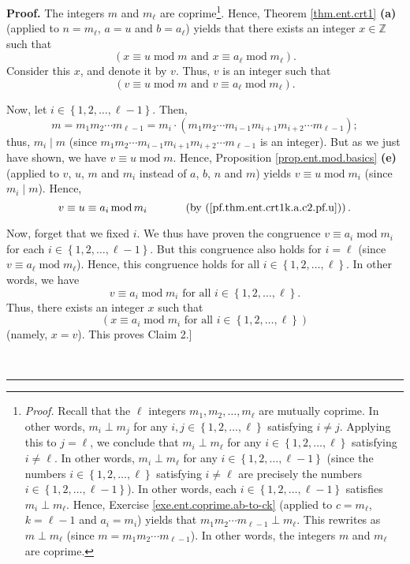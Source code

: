 \documentclass[numbers=enddot,12pt,final,onecolumn,notitlepage]{scrartcl}%
\numberwithin{exer}{subsection}
\theoremstyle{definition}
\newenvironment{proof}[1][Proof]{\noindent\textbf{#1.} }{\ \rule{0.5em}{0.5em}}
\begin{document}
\begin{proof}
The integers $m$ and $m_{\ell}$ are coprime\footnote{\textit{Proof.} Recall
that the $\ell$ integers $m_{1},m_{2},\ldots,m_{\ell}$ are mutually coprime.
In other words, $m_{i}\perp m_{j}$ for any $i,j\in\left\{  1,2,\ldots
,\ell\right\}  $ satisfying $i\neq j$. Applying this to $j=\ell$, we conclude
that $m_{i}\perp m_{\ell}$ for any $i\in\left\{  1,2,\ldots,\ell\right\}  $
satisfying $i\neq\ell$. In other words, $m_{i}\perp m_{\ell}$ for any
$i\in\left\{  1,2,\ldots,\ell-1\right\}  $ (since the numbers $i\in\left\{
1,2,\ldots,\ell\right\}  $ satisfying $i\neq\ell$ are precisely the numbers
$i\in\left\{  1,2,\ldots,\ell-1\right\}  $). In other words, each
$i\in\left\{  1,2,\ldots,\ell-1\right\}  $ satisfies $m_{i}\perp m_{\ell}$.
Hence, Exercise \ref{exe.ent.coprime.ab-to-ck} (applied to $c=m_{\ell}$,
$k=\ell-1$ and $a_{i}=m_{i}$) yields that $m_{1}m_{2}\cdots m_{\ell-1}\perp
m_{\ell}$. This rewrites as $m\perp m_{\ell}$ (since $m=m_{1}m_{2}\cdots
m_{\ell-1}$). In other words, the integers $m$ and $m_{\ell}$ are coprime.}.
Hence, Theorem \ref{thm.ent.crt1} \textbf{(a)} (applied to $n=m_{\ell}$, $a=u$
and $b=a_{\ell}$) yields that there exists an integer $x\in\mathbb{Z}$ such
that%
\[
\left(  x\equiv u\operatorname{mod}m\text{ and }x\equiv a_{\ell}%
\operatorname{mod}m_{\ell}\right)  .
\]
Consider this $x$, and denote it by $v$. Thus, $v$ is an integer such that%
\[
\left(  v\equiv u\operatorname{mod}m\text{ and }v\equiv a_{\ell}%
\operatorname{mod}m_{\ell}\right)  .
\]


Now, let $i\in\left\{  1,2,\ldots,\ell-1\right\}  $. Then,
\[
m=m_{1}m_{2}\cdots m_{\ell-1}=m_{i}\cdot\left(  m_{1}m_{2}\cdots
m_{i-1}m_{i+1}m_{i+2}\cdots m_{\ell-1}\right)  ;
\]
thus, $m_{i}\mid m$ (since $m_{1}m_{2}\cdots m_{i-1}m_{i+1}m_{i+2}\cdots
m_{\ell-1}$ is an integer). But as we just have shown, we have $v\equiv
u\operatorname{mod}m$. Hence, Proposition \ref{prop.ent.mod.basics}
\textbf{(e)} (applied to $v$, $u$, $m$ and $m_{i}$ instead of $a$, $b$, $n$
and $m$) yields $v\equiv u\operatorname{mod}m_{i}$ (since $m_{i}\mid m$).
Hence,
\[
v\equiv u\equiv a_{i}\operatorname{mod}m_{i}\ \ \ \ \ \ \ \ \ \ \left(
\text{by (\ref{pf.thm.ent.crt1k.a.c2.pf.u})}\right)  .
\]


Now, forget that we fixed $i$. We thus have proven the congruence $v\equiv
a_{i}\operatorname{mod}m_{i}$ for each $i\in\left\{  1,2,\ldots,\ell
-1\right\}  $. But this congruence also holds for $i=\ell$ (since $v\equiv
a_{\ell}\operatorname{mod}m_{\ell}$). Hence, this congruence holds for all
$i\in\left\{  1,2,\ldots,\ell\right\}  $. In other words, we have%
\[
v\equiv a_{i}\operatorname{mod}m_{i}\text{ for all }i\in\left\{
1,2,\ldots,\ell\right\}  \text{.}%
\]
Thus, there exists an integer $x$ such that
\[
\left(  x\equiv a_{i}\operatorname{mod}m_{i}\text{ for all }i\in\left\{
1,2,\ldots,\ell\right\}  \right)
\]
(namely, $x=v$). This proves Claim 2.]


\end{proof}
\end{document}
